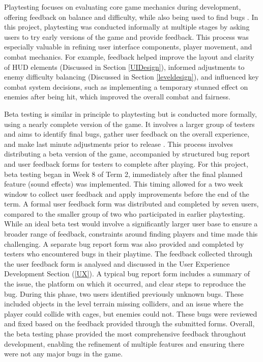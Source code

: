 \documentclass[10pt]{final_report}
\begin{document}
Playtesting focuses on evaluating core game mechanics during development, offering feedback on balance and difficulty, while also being used to find bugs \cite{flashjungle_2022}. In this project, playtesting was conducted informally at multiple stages by asking users to try early versions of the game and provide feedback. This process was especially valuable in refining user interface components, player movement, and combat mechanics. For example, feedback helped improve the layout and clarity of HUD elements (Discussed in  Section \ref{UIDesign}), informed adjustments to enemy difficulty balancing (Discussed in Section \ref{leveldesign}), and influenced key combat system decisions, such as implementing a temporary stunned effect on enemies after being hit, which improved the overall combat and fairness. \newline

Beta testing is similar in principle to playtesting but is conducted more formally, using a nearly complete version of the game. It involves a larger group of testers and aims to identify final bugs, gather user feedback on the overall experience, and make last minute adjustments prior to release \cite{flashjungle_2022}. This process involves distributing a beta version of the game, accompanied by structured bug report and user feedback forms for testers to complete after playing. For this project, beta testing began in Week 8 of Term 2, immediately after the final planned feature (sound effects) was implemented. This timing allowed for a two week window to collect user feedback and apply improvements before the end of the term. A formal user feedback form was distributed and completed by seven users, compared to the smaller group of two who participated in earlier playtesting. While an ideal beta test would involve a significantly larger user base to ensure a broader range of feedback, constraints around finding players and time made this challenging. A separate bug report form was also provided and completed by testers who encountered bugs in their playtime. The feedback collected through the user feedback form is analysed and discussed in the User Experience Development Section (\ref{UX}). A typical bug report form includes a summary of the issue, the platform on which it occurred, and clear steps to reproduce the bug. During this phase, two users identified previously unknown bugs. These included objects in the level terrain missing colliders, and an issue where the player could collide with cages, but enemies could not. These bugs were reviewed and fixed based on the feedback provided through the submitted forms. Overall, the beta testing phase provided the most comprehensive feedback throughout development, enabling the refinement of multiple features and ensuring there were not any major bugs in the game. \newline
\end{document}
